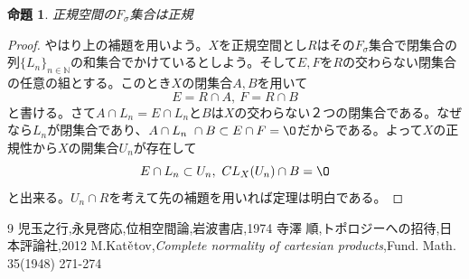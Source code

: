 \documentclass[leqno]{jsarticle}
\newtheorem{prop}[thm]{命題}
\newcommand{\nn}{\mathbb{N}}
\begin{document}
\begin{prop}
正規空間の$F_{\sigma}$集合は正規
\end{prop}
\begin{proof}
やはり上の補題を用いよう。$X$を正規空間とし$R$はその$F_{\sigma}$集合で閉集合の列$\{L_n\}_{n\in\nn}$の和集合でかけているとしよう。そして$E,F$を$R$の交わらない閉集合の任意の組とする。このとき$X$の閉集合$A,B$を用いて
\[
E=R\cap A,\ F=R\cap B
\]
と書ける。さて$A\cap L_n=E\cap L_n$と$B$は$X$の交わらない２つの閉集合である。なぜなら$L_n$が閉集合であり、$A\cap L_n\ \cap B\subset E\cap F=\O$だからである。よって$X$の正規性から$X$の開集合$U_n$が存在して
\[
E\cap L_n\subset U_n,\ CL_X(U_n)\cap B=\O
\]
と出来る。$U_n\cap R$を考えて先の補題を用いれば定理は明白である。
\end{proof}

















	
\begin{thebibliography}{9}
児玉之行,永見啓応,位相空間論,岩波書店,1974
寺澤 順,トポロジーへの招待,日本評論社,2012
M.Kat$\check{{\rm e}}$tov,{\it Complete normality of cartesian products},Fund. Math. 35(1948) 271-274
\end{thebibliography}




			
\end{document}
